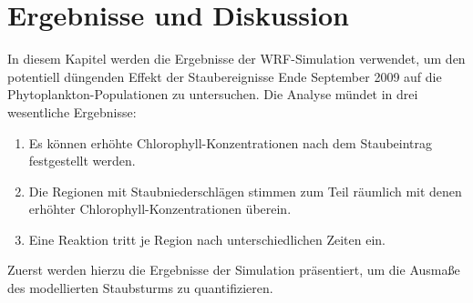 \documentclass[12pt,a4paper,onecolumn,headheight=30pt]{scrartcl}
\begin{document}
\section{Ergebnisse und Diskussion} \label{sec:auswertung}
In diesem Kapitel werden die Ergebnisse der WRF-Simulation verwendet, um den potentiell düngenden Effekt der Staubereignisse Ende September 2009 auf die Phytoplankton-Populationen zu untersuchen. Die Analyse mündet in drei wesentliche Ergebnisse:
\begin{enumerate}
\item Es können erhöhte Chlorophyll-Konzentrationen nach dem Staubeintrag festgestellt werden.
\item Die Regionen mit Staubniederschlägen stimmen zum Teil räumlich mit denen erhöhter Chlorophyll-Konzentrationen überein.
\item Eine Reaktion tritt je Region nach unterschiedlichen Zeiten ein.
\end{enumerate}
Zuerst werden hierzu die Ergebnisse der Simulation präsentiert, um die Ausmaße des modellierten Staubsturms zu quantifizieren. 
\end{document}
